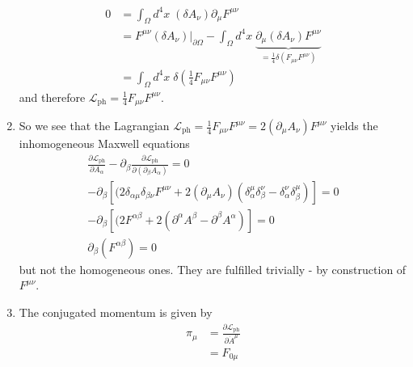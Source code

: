 \documentclass[10pt,a4paper]{book}
\theoremstyle{definition}
\begin{document}
\begin{enumerate}
    \begin{align}
        0
        &=\int_\Omega d^4x\;(\delta A_\nu) \partial_\mu F^{\mu\nu}\\
        &=F^{\mu\nu}(\delta A_\nu)|_{\partial\Omega}-\int_\Omega d^4x\;\underbrace{\partial_\mu(\delta A_\nu)F^{\mu\nu}}_{=\frac{1}{4}\delta(F_{\mu\nu}F^{\mu\nu})}\\
        &=\int_{\Omega}d^4x\;\delta\left(\frac{1}{4}F_{\mu\nu}F^{\mu\nu}\right)
    \end{align}
    and therefore $\mathscr{L}_\text{ph}=\frac{1}{4}F_{\mu\nu}F^{\mu\nu}$.
    \item So we see that the Lagrangian $\mathscr{L}_\text{ph}=\frac{1}{4}F_{\mu\nu}F^{\mu\nu}=2(\partial_\mu A_\nu)F^{\mu\nu}$ yields the inhomogeneous Maxwell equations 
    \begin{align}
        \frac{\partial\mathscr{L}_\text{ph}}{\partial A_\alpha}-\partial_\beta\frac{\partial\mathscr{L}_\text{ph}}{\partial(\partial_\beta A_\alpha)}=0\\
        -\partial_\beta\left[(2\delta_{\alpha\mu}\delta_{\beta\nu}F^{\mu\nu}+2(\partial_\mu A_\nu)(\delta_\alpha^\mu\delta_\beta^\nu-\delta_\alpha^\nu\delta_\beta^\mu)\right]=0\\
        -\partial_\beta\left[(2F^{\alpha\beta}+2(\partial^\alpha A^\beta-\partial^\beta A^\alpha)\right]=0\\
        \partial_\beta(F^{\alpha\beta})=0
    \end{align}
    but not the homogeneous ones. They are fulfilled trivially - by construction of $F^{\mu\nu}$.
    \item The conjugated momentum is given by
    \begin{align}
        \pi_\mu
        &=\frac{\partial\mathscr{L}_\text{ph}}{\partial \dot{A}^\mu}\\
        &= F_{0\mu}
    \end{align}
\end{enumerate}
\end{document}
